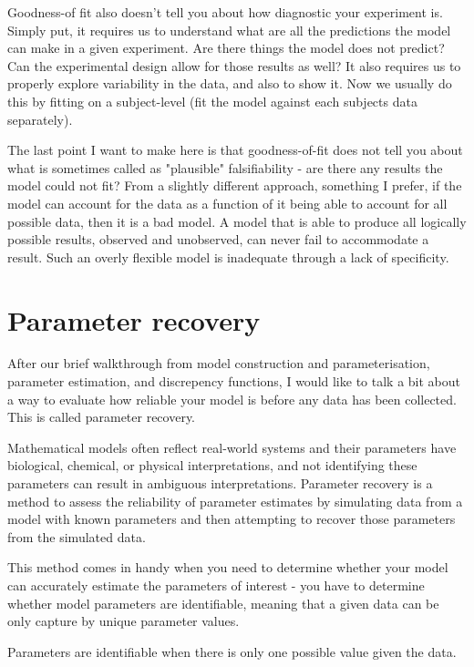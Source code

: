 \documentclass[12pt]{article}
\begin{document}
Goodness-of fit also doesn't tell you about how diagnostic your experiment is. Simply put, it requires us to understand what are all the predictions the model can make in a given experiment. Are there things the model does not predict? Can the experimental design allow for those results as well? It also requires us to properly explore variability in the data, and also to show it. Now we usually do this by fitting on a subject-level (fit the model against each subjects data separately).

The last point I want to make here is that goodness-of-fit does not tell you about what is sometimes called as "plausible" falsifiability - are there any results the model could not fit? From a slightly different approach, something I prefer, if the model can account for the data as a function of it being able to account for all possible data, then it is a bad model. A model that is able to produce all logically possible results, observed and unobserved, can never fail to accommodate a result. Such an overly flexible model is inadequate through a lack of specificity.

\section{Parameter recovery}

After our brief walkthrough from model construction and parameterisation, parameter estimation, and discrepency functions, I would like to talk a bit about a way to evaluate how reliable your model is before any data has been collected. This is called parameter recovery.

Mathematical models often reflect real-world systems and their parameters have biological, chemical, or physical interpretations, and not identifying these parameters can result in ambiguous interpretations. Parameter recovery is a method to assess the reliability of parameter estimates by simulating data from a model with known parameters and then attempting to recover those parameters from the simulated data.

This method comes in handy when you need to determine whether your model can accurately estimate the parameters of interest - you have to determine whether model parameters are identifiable, meaning that a given data can be only capture by unique parameter values.

Parameters are identifiable when there is only one possible value given the data.
\end{document}
